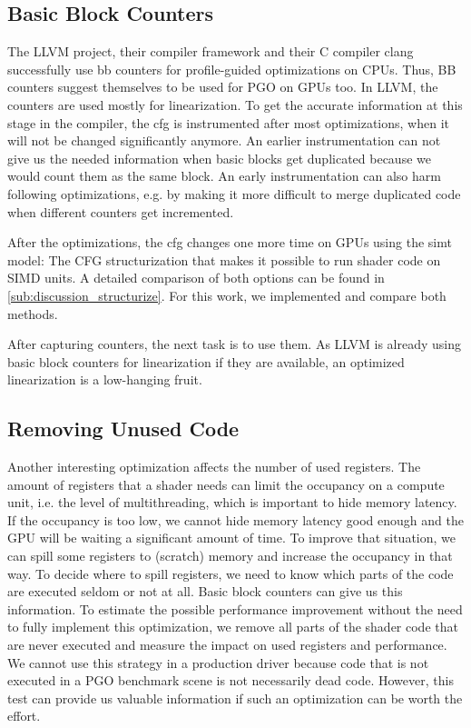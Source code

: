 \subsection{Basic Block Counters}
\label{sub:design_counters}
The LLVM project, their compiler framework and their C compiler clang successfully use \gls{bb} counters for profile-guided optimizations on CPUs. Thus, BB counters suggest themselves to be used for PGO on GPUs too.
In LLVM, the counters are used mostly for linearization. To get the accurate information at this stage in the compiler, the \gls{cfg} is instrumented after most optimizations, when it will not be changed significantly anymore.
An earlier instrumentation can not give us the needed information when basic blocks get duplicated because we would count them as the same block. An early instrumentation can also harm following optimizations, e.g. by making it more difficult to merge duplicated code when different counters get incremented.

After the optimizations, the \gls{cfg} changes one more time on GPUs using the \gls{simt} model: The CFG structurization that makes it possible to run shader code on SIMD units.
A detailed comparison of both options can be found in \cref{sub:discussion_structurize}. For this work, we implemented and compare both methods.

After capturing counters, the next task is to use them. As LLVM is already using basic block counters for linearization if they are available, an optimized linearization is a low-hanging fruit.

\subsection{Removing Unused Code}
\label{sub:design_unused}
Another interesting optimization affects the number of used registers.
The amount of registers that a shader needs can limit the occupancy on a compute unit, i.e. the level of multithreading, which is important to hide memory latency.
If the occupancy is too low, we cannot hide memory latency good enough and the GPU will be waiting a significant amount of time.
To improve that situation, we can spill some registers to (scratch) memory and increase the occupancy in that way.
To decide where to spill registers, we need to know which parts of the code are executed seldom or not at all.
Basic block counters can give us this information.
To estimate the possible performance improvement without the need to fully implement this optimization, we remove all parts of the shader code that are never executed and measure the impact on used registers and performance.
We cannot use this strategy in a production driver because code that is not executed in a PGO benchmark scene is not necessarily dead code.
However, this test can provide us valuable information if such an optimization can be worth the effort.


